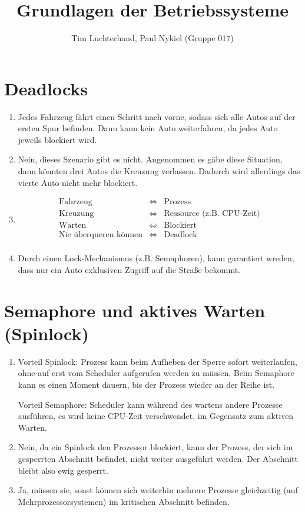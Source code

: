 \documentclass[DIN, pagenumber=false, fontsize=11pt, parskip=half]{scrartcl}
\title{Grundlagen der Betriebssysteme}
\author{Tim Luchterhand, Paul Nykiel (Gruppe 017)}
\begin{document}
    \maketitle
    \section{Deadlocks}
    \begin{enumerate}[label=(\alph*)]
        \item Jedes Fahrzeug fährt einen \glqq{}Schritt\grqq{} nach vorne, sodass sich alle Autos auf der ersten Spur befinden.
            Dann kann kein Auto weiterfahren, da jedes Auto jeweils blockiert wird.
        \item Nein, dieses Szenario gibt es nicht. Angenommen es gäbe diese Situation, dann könnten drei Autos die Kreuzung verlassen. Dadurch wird allerdings das vierte Auto nicht mehr blockiert.
        \item 
            \begin{eqnarray*}
                \text{Fahrzeug} &\Leftrightarrow& \text{Prozess} \\
                \text{Kreuzung} &\Leftrightarrow& \text{Ressource (z.B. CPU-Zeit)} \\
                \text{Warten} &\Leftrightarrow& \text{Blockiert} \\
                \text{Nie überqueren können} &\Leftrightarrow& \text{Deadlock} \\
            \end{eqnarray*}
        \item Durch einen Lock-Mechanismus (z.B. Semaphoren), kann garantiert wreden, dass nur ein Auto exklusiven Zugriff auf die Straße bekommt.
    \end{enumerate}
    \section{Semaphore und aktives Warten (Spinlock)}
    \begin{enumerate}[label=(\alph*)]
        \item
            Vorteil Spinlock: Prozess kann beim Aufheben der Sperre sofort weiterlaufen, ohne auf erst vom Scheduler aufgerufen werden zu müssen. Beim Semaphore kann es einen Moment dauern, bis der Prozess wieder an der Reihe ist.

            Vorteil Semaphore: Scheduler kann während des wartens andere Prozesse ausführen, es wird keine CPU-Zeit verschwendet, im Gegensatz zum aktiven Warten.
        \item Nein, da ein Spinlock den Prozessor blockiert, kann der Prozess, der sich im gesperrten Abschnitt befindet, nicht weiter ausgeführt werden. Der Abschnitt bleibt also ewig gesperrt.
        \item Ja, müssen sie, sonst können sich weiterhin mehrere Prozesse gleichzeitig (auf Mehrprozessorsystemen) im kritischen Abschnitt befinden.
    \end{enumerate}
\end{document}
